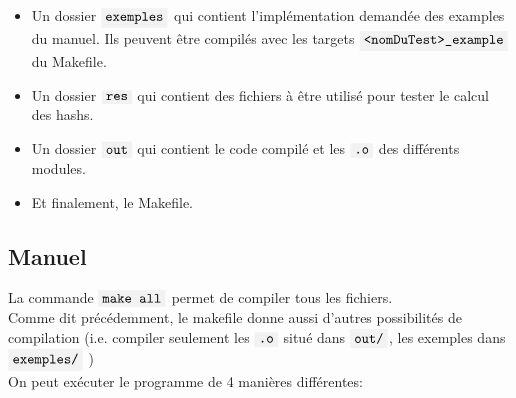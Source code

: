 \documentclass[draft, french]{article}
\newcommand{\code}[1]{$\mbox{\colorbox{light-gray}{\texttt{#1}}}$}
\begin{document}
\begin{itemize}
    \item Un dossier \code{exemples} qui contient l'implémentation demandée des examples du manuel. Ils peuvent être compilés avec les targets \code{<nomDuTest>\_example} du Makefile.
    
    \item Un dossier \code{res} qui contient des fichiers à être utilisé pour tester le calcul des hashs. 
    
    \item Un dossier \code{out} qui contient le code compilé et les \code{.o} des différents modules.
    
    \item Et finalement, le Makefile.
    
\end{itemize}

\subsection{Manuel}

La commande \code{make all} permet de compiler tous les fichiers.\\

Comme dit précédemment, le makefile donne aussi d'autres possibilités de compilation (i.e. compiler seulement les \code{.o} situé dans \code{out/}, les exemples dans \code{exemples/} \ldot) \\

On peut exécuter le programme de 4 manières différentes:
\end{document}
